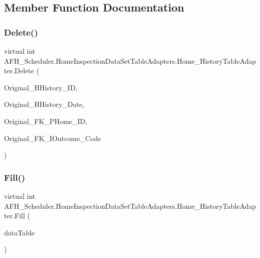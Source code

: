 \subsection{Member Function Documentation}
\mbox{\label{class_a_f_h___scheduler_1_1_home_inspection_data_set_table_adapters_1_1_home___history_table_adapter_af8aa5a25cca9cc1d1a159f4266a9840d}} 
\subsubsection{Delete()}
{\footnotesize\ttfamily virtual int A\+F\+H\+\_\+\+Scheduler.\+Home\+Inspection\+Data\+Set\+Table\+Adapters.\+Home\+\_\+\+History\+Table\+Adapter.\+Delete (\begin{DoxyParamCaption}\item[{long}]{Original\+\_\+\+H\+History\+\_\+\+ID,  }\item[{string}]{Original\+\_\+\+H\+History\+\_\+\+Date,  }\item[{global\+::\+System.\+Nullable$<$ long $>$}]{Original\+\_\+\+F\+K\+\_\+\+P\+Home\+\_\+\+ID,  }\item[{string}]{Original\+\_\+\+F\+K\+\_\+\+I\+Outcome\+\_\+\+Code }\end{DoxyParamCaption})\hspace{0.3cm}{\ttfamily [virtual]}}

\mbox{\label{class_a_f_h___scheduler_1_1_home_inspection_data_set_table_adapters_1_1_home___history_table_adapter_ae99d6742a69280929cee4121f4c2ff09}} 
\subsubsection{Fill()}
{\footnotesize\ttfamily virtual int A\+F\+H\+\_\+\+Scheduler.\+Home\+Inspection\+Data\+Set\+Table\+Adapters.\+Home\+\_\+\+History\+Table\+Adapter.\+Fill (\begin{DoxyParamCaption}\item[{\textbf{ Home\+Inspection\+Data\+Set.\+Home\+\_\+\+History\+Data\+Table}}]{data\+Table }\end{DoxyParamCaption})\hspace{0.3cm}{\ttfamily [virtual]}}

